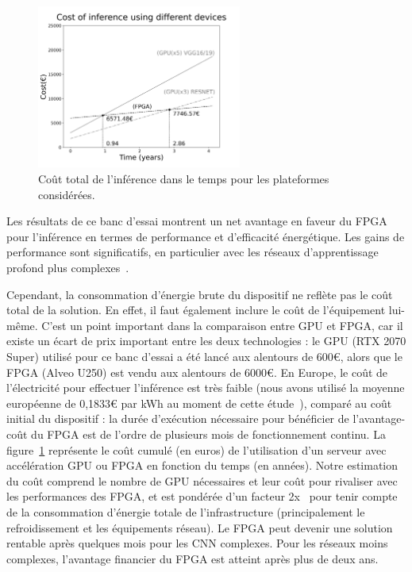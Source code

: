 \begin{figure}[!ht]
    \centering
    \includegraphics[width=0.6\textwidth]{4_Chapitre4/figures/characterization/cost_devices_time.png}
    \caption{Coût total de l'inférence dans le temps pour les plateformes considérées.}
    \label{figure:herofake-cost-over-time}
\end{figure}

Les résultats de ce banc d'essai montrent un net avantage en faveur du FPGA pour l'inférence en termes de performance et d'efficacité énergétique. Les gains de performance sont significatifs, en particulier avec les réseaux d'apprentissage profond plus complexes~\cite{8782524}. %

Cependant, la consommation d'énergie brute du dispositif ne reflète pas le coût total de la solution. En effet, il faut également inclure le coût de l'équipement lui-même. C'est un point important dans la comparaison entre GPU et FPGA, car il existe un écart de prix important entre les deux technologies : le GPU (RTX 2070 Super) utilisé pour ce banc d'essai a été lancé aux alentours de 600€, alors que le FPGA (Alveo U250) est vendu aux alentours de 6000€. En Europe, le coût de l'électricité pour effectuer l'inférence est très faible (nous avons utilisé la moyenne européenne de 0,1833€ par kWh au moment de cette étude~\cite{energy-price}), comparé au coût initial du dispositif : la durée d'exécution nécessaire pour bénéficier de l'avantage-coût du FPGA est de l'ordre de plusieurs mois de fonctionnement continu. La figure~\ref{figure:herofake-cost-over-time} représente le coût cumulé (en euros) de l'utilisation d'un serveur avec accélération GPU ou FPGA en fonction du temps (en années). Notre estimation du coût comprend le nombre de GPU nécessaires et leur coût pour rivaliser avec les performances des FPGA, et est pondérée d'un facteur 2x~\cite{shehabiUnitedStatesData2016} pour tenir compte de la consommation d'énergie totale de l'infrastructure (principalement le refroidissement et les équipements réseau). Le FPGA peut devenir une solution rentable après quelques mois pour les CNN complexes. Pour les réseaux moins complexes, l'avantage financier du FPGA est atteint après plus de deux ans.

